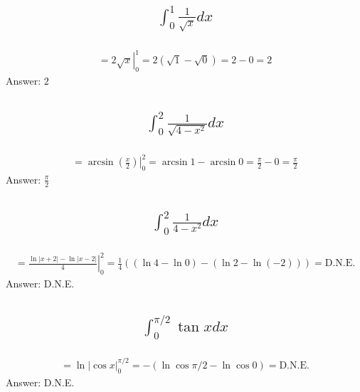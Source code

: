 \documentclass{article}
\begin{document}
\subsection{
	\begin{align*}
		\int_0^1{\frac{1}{\sqrt{x}} dx}
	\end{align*}
}
\begin{align*}
	= \left. 2\sqrt{x} \right|_{0}^{1} = 2 \left( \sqrt{1} - \sqrt{0} \right) = 2 - 0 = 2
\end{align*}
Answer: $2$

\subsection{
	\begin{align*}
		\int_0^2{\frac{1}{\sqrt{4 - x^2}} dx}
	\end{align*}
}
\begin{align*}
	= \left. \arcsin{\left( \frac{x}{2} \right)} \right|_{0}^{2} = \arcsin{1} - \arcsin{0} = \frac{\pi}{2} - 0 = \frac{\pi}{2}
\end{align*}
Answer: $\frac{\pi}{2}$

\subsection{
	\begin{align*}
		\int_0^2{\frac{1}{4 - x^2} dx}
	\end{align*}
}
\begin{align*}
	= \left. \frac{\ln{|x + 2|} - \ln{|x - 2|}}{4}\right|_{0}^{2} = \frac{1}{4} \left( \left( \ln{4} - \ln{0} \right) - \left( \ln{2} - \ln{(-2)} \right) \right) = \text{D.N.E.}
\end{align*}
Answer: D.N.E.

\subsection{
	\begin{align*}
		\int_0^{\pi/2}{\tan{x} dx}
	\end{align*}
}
\begin{align*}
	= \left. \ln{|\cos{x}} \right|_{0}^{\pi/2} = -\left( \ln{\cos{\pi/2}} - \ln{\cos{0}} \right) = \text{D.N.E.}
\end{align*}
Answer: D.N.E.

\end{document}
